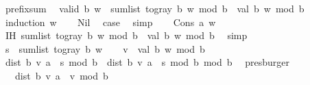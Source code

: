 \begin{isabellebody}
\isamarkupfalse%
\ prefix{\isacharunderscore}{\kern0pt}sum{\isacharcolon}{\kern0pt}\isanewline
\ \ {\isachardoublequoteopen}valid\ b\ w\ {\isasymLongrightarrow}\ sum{\isacharunderscore}{\kern0pt}list\ {\isacharparenleft}{\kern0pt}to{\isacharunderscore}{\kern0pt}gray\ b\ w{\isacharparenright}{\kern0pt}\ mod\ b\ {\isacharequal}{\kern0pt}\ val\ b\ w\ mod\ b{\isachardoublequoteclose}\isanewline
%
\isadelimproof
%
\endisadelimproof
%
\isatagproof
{}\isamarkupfalse%
\ {\isacharparenleft}{\kern0pt}induction\ w{\isacharparenright}{\kern0pt}\isanewline
\ \ \isamarkupfalse%
\ Nil\ \isamarkupfalse%
\ {\isacharquery}{\kern0pt}case\ \isamarkupfalse%
\ simp\isanewline
{}\isamarkupfalse%
\isanewline
\ \ \isamarkupfalse%
\ {\isacharparenleft}{\kern0pt}Cons\ a\ w{\isacharparenright}{\kern0pt}\isanewline
\ \ \isamarkupfalse%
\ IH{\isacharcolon}{\kern0pt}\ {\isachardoublequoteopen}sum{\isacharunderscore}{\kern0pt}list\ {\isacharparenleft}{\kern0pt}to{\isacharunderscore}{\kern0pt}gray\ b\ w{\isacharparenright}{\kern0pt}\ mod\ b\ {\isacharequal}{\kern0pt}\ val\ b\ w\ mod\ b{\isachardoublequoteclose}\ \isamarkupfalse%
\ simp\isanewline
\ \ \isamarkupfalse%
\ {\isacharquery}{\kern0pt}s\ {\isacharequal}{\kern0pt}\ {\isachardoublequoteopen}sum{\isacharunderscore}{\kern0pt}list\ {\isacharparenleft}{\kern0pt}to{\isacharunderscore}{\kern0pt}gray\ b\ w{\isacharparenright}{\kern0pt}{\isachardoublequoteclose}\isanewline
\ \ \isamarkupfalse%
\ {\isacharquery}{\kern0pt}v\ {\isacharequal}{\kern0pt}\ {\isachardoublequoteopen}val\ b\ w\ mod\ b{\isachardoublequoteclose}\isanewline
\ \ \isamarkupfalse%
\ {\isachardoublequoteopen}{\isacharparenleft}{\kern0pt}dist{}\ b\ {\isacharquery}{\kern0pt}v\ a\ {\isacharplus}{\kern0pt}\ {\isacharquery}{\kern0pt}s{\isacharparenright}{\kern0pt}\ mod\ b\ {\isacharequal}{\kern0pt}\ {\isacharparenleft}{\kern0pt}dist{}\ b\ {\isacharquery}{\kern0pt}v\ a\ {\isacharplus}{\kern0pt}\ {\isacharquery}{\kern0pt}s\ mod\ b{\isacharparenright}{\kern0pt}\ mod\ b{\isachardoublequoteclose}\ \isamarkupfalse%
\ presburger\isanewline
\ \ \isamarkupfalse%
\ \isamarkupfalse%
\ {\isachardoublequoteopen}{\isachardot}{\kern0pt}{\isachardot}{\kern0pt}{\isachardot}{\kern0pt}\ {\isacharequal}{\kern0pt}\ {\isacharparenleft}{\kern0pt}dist{}\ b\ {\isacharquery}{\kern0pt}v\ a\ {\isacharplus}{\kern0pt}\ {\isacharquery}{\kern0pt}v{\isacharparenright}{\kern0pt}\ mod\ b{\isachardoublequoteclose}\ \isamarkupfalse%

\end{isabellebody}
